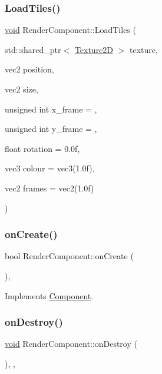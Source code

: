 \subsubsection{\texorpdfstring{Load\+Tiles()}{LoadTiles()}}
{\footnotesize\ttfamily \hyperlink{imgui__impl__opengl3__loader_8h_ac668e7cffd9e2e9cfee428b9b2f34fa7}{void} Render\+Component\+::\+Load\+Tiles (\begin{DoxyParamCaption}\item[{std\+::shared\+\_\+ptr$<$ \hyperlink{classTexture2D}{Texture2D} $>$}]{texture,  }\item[{vec2}]{position,  }\item[{vec2}]{size,  }\item[{unsigned int}]{x\+\_\+frame = {},  }\item[{unsigned int}]{y\+\_\+frame = {},  }\item[{float}]{rotation = {\ttfamily 0.0f},  }\item[{vec3}]{colour = {\ttfamily vec3(1.0f)},  }\item[{vec2}]{frames = {\ttfamily vec2(1.0f)} }\end{DoxyParamCaption})}

\mbox{\label{classRenderComponent_a5ecc72f2a9249c4df22365dbe7ca49b0}} 
\subsubsection{\texorpdfstring{on\+Create()}{onCreate()}}
{\footnotesize\ttfamily bool Render\+Component\+::on\+Create (\begin{DoxyParamCaption}{ }\end{DoxyParamCaption})\hspace{0.3cm}{\ttfamily [override]}, {\ttfamily [virtual]}}



Implements \hyperlink{classComponent_a3a1537a8b8bcdb2155afbb925c77b0a2}{Component}.

\mbox{\label{classRenderComponent_a2d05ddd16edf5d2022d46a640a74a4da}} 
\subsubsection{\texorpdfstring{on\+Destroy()}{onDestroy()}}
{\footnotesize\ttfamily \hyperlink{imgui__impl__opengl3__loader_8h_ac668e7cffd9e2e9cfee428b9b2f34fa7}{void} Render\+Component\+::on\+Destroy (\begin{DoxyParamCaption}{ }\end{DoxyParamCaption})\hspace{0.3cm}{\ttfamily [inline]}, {\ttfamily [override]}, {\ttfamily [virtual]}}



